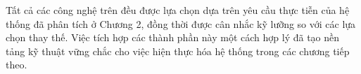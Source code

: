 \documentclass[../DoAn.tex]{subfiles}
\begin{document}
Tất cả các công nghệ trên đều được lựa chọn dựa trên yêu cầu thực tiễn của hệ thống đã phân tích ở Chương 2, đồng thời được cân nhắc kỹ lưỡng so với các lựa chọn thay thế. Việc tích hợp các thành phần này một cách hợp lý đã tạo nền tảng kỹ thuật vững chắc cho việc hiện thực hóa hệ thống trong các chương tiếp theo.
\end{document}
